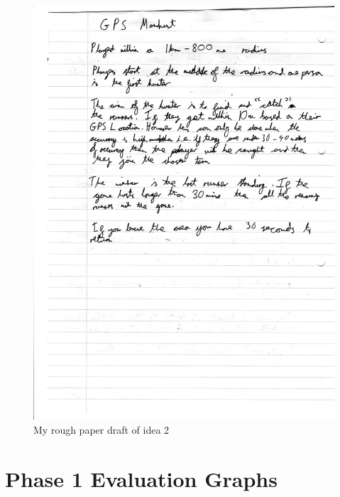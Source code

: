 \documentclass{l4proj}
\begin{document}
\begin{appendices}
\begin{figure}
    \centering
    \includegraphics[width=\linewidth]{images/idea2.pdf} 
    \caption{My rough paper draft of idea 2}
    \label{fig:idea2}
\end{figure}

\chapter{Phase 1 Evaluation Graphs}


\end{appendices}
\end{document}
